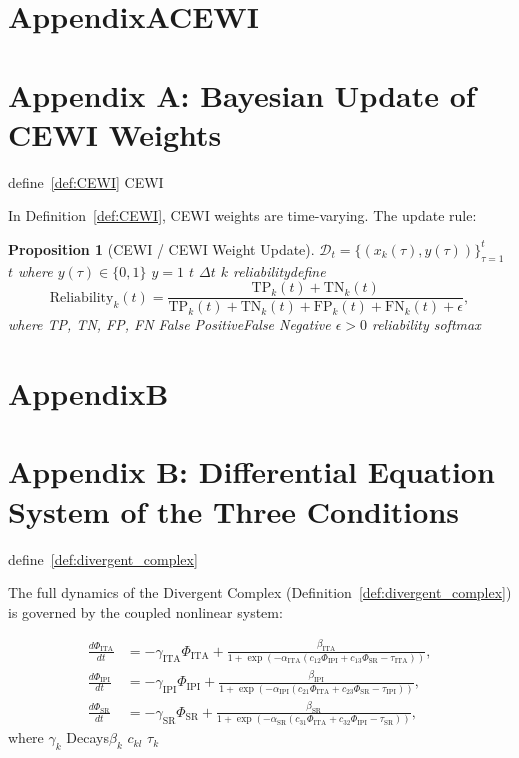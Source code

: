 \documentclass[11pt,a4paper]{article}
\newtheorem{proposition}[theorem]{Proposition}
\theoremstyle{remark}
\begin{document}
\section{AppendixACEWI }
\section{Appendix A: Bayesian Update of CEWI Weights}

define~\ref{def:CEWI} CEWI 

In Definition~\ref{def:CEWI}, CEWI weights are time-varying. The update rule:

\begin{proposition}[CEWI  / CEWI Weight Update]
\label{prop:weight_update}
 $\mathcal{D}_t = \{(x_k(\tau), y(\tau))\}_{\tau=1}^{t}$  $t$ 
where $y(\tau) \in \{0, 1\}$ $y=1$  $t$  $\Delta t$ 
 $k$ reliabilitydefine
\[
\text{Reliability}_k(t) = \frac{\text{TP}_k(t) + \text{TN}_k(t)}
                                 {\text{TP}_k(t) + \text{TN}_k(t) + 
                                  \text{FP}_k(t) + \text{FN}_k(t) + \epsilon},
\]
where TP, TN, FP, FN False PositiveFalse Negative
$\epsilon > 0$ reliability softmax 
\end{proposition}

\section{AppendixB}
\section{Appendix B: Differential Equation System of the Three Conditions}

define~\ref{def:divergent_complex}

The full dynamics of the Divergent Complex (Definition~\ref{def:divergent_complex})
is governed by the coupled nonlinear system:

\begin{align}
\frac{d\Phi_{\text{ITA}}}{dt} &= 
    -\gamma_{\text{ITA}} \Phi_{\text{ITA}} + 
    \frac{\beta_{\text{ITA}}}{1 + \exp(-\alpha_{\text{ITA}}(c_{12}\Phi_{\text{IPI}} + c_{13}\Phi_{\text{SR}} - \tau_{\text{ITA}}))}, \\
\frac{d\Phi_{\text{IPI}}}{dt} &= 
    -\gamma_{\text{IPI}} \Phi_{\text{IPI}} + 
    \frac{\beta_{\text{IPI}}}{1 + \exp(-\alpha_{\text{IPI}}(c_{21}\Phi_{\text{ITA}} + c_{23}\Phi_{\text{SR}} - \tau_{\text{IPI}}))}, \\
\frac{d\Phi_{\text{SR}}}{dt} &= 
    -\gamma_{\text{SR}} \Phi_{\text{SR}} + 
    \frac{\beta_{\text{SR}}}{1 + \exp(-\alpha_{\text{SR}}(c_{31}\Phi_{\text{ITA}} + c_{32}\Phi_{\text{IPI}} - \tau_{\text{SR}}))},
\end{align}
where $\gamma_k$ Decays$\beta_k$ 
$c_{kl}$ $\tau_k$ 
\end{document}
